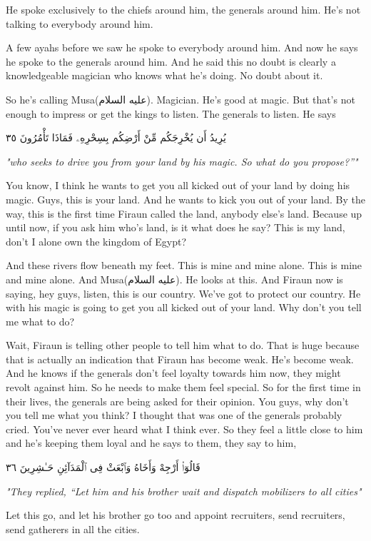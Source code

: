 \documentclass[12pt]{article}
\newcommand{\as}{\textarabic{(عليه السلام)}}
\begin{document}
He spoke exclusively to the chiefs around him, the generals around him. He's not talking to everybody around him. 

A few ayahs before we saw he spoke to everybody around him. And now he says he spoke to the generals around him. And he said this no doubt is clearly a knowledgeable magician who knows what he's doing. No doubt about it. 

So he's calling Musa\as{}. Magician. He's good at magic. But that's not enough to impress or get the kings to listen. The generals to listen. He says 

\textarabic{يُرِيدُ أَن يُخْرِجَكُم مِّنْ أَرْضِكُم بِسِحْرِهِۦ فَمَاذَا تَأْمُرُونَ ٣٥}

\textit{"who seeks to drive you from your land by his magic. So what do you propose?”"}

You know, I think he wants to get you all kicked out of your land by doing his magic. Guys, this is your land. And he wants to kick you out of your land. By the way, this is the first time Firaun called the land, anybody else's land. Because up until now, if you ask him who's land, is it what does he say? This is my land, don't I alone own the kingdom of Egypt? 

And these rivers flow beneath my feet. This is mine and mine alone. This is mine and mine alone. And Musa\as{}. He looks at this. And Firaun now is saying, hey guys, listen, this is our country. We've got to protect our country. He with his magic is going to get you all kicked out of your land. Why don't you tell me what to do? 

Wait, Firaun is telling other people to tell him what to do. That is huge because that is actually an indication that Firaun has become weak. He's become weak. And he knows if the generals don't feel loyalty towards him now, they might revolt against him. So he needs to make them feel special. So for the first time in their lives, the generals are being asked for their opinion. You guys, why don't you tell me what you think? I thought that was one of the generals probably cried. You've never ever heard what I think ever. So they feel a little close to him and he's keeping them loyal and he says to them, they say to him, 

\textarabic{قَالُوٓا۟ أَرْجِهْ وَأَخَاهُ وَٱبْعَثْ فِى ٱلْمَدَآئِنِ حَـٰشِرِينَ ٣٦}

\textit{"They replied, “Let him and his brother wait and dispatch mobilizers to all cities"}

Let this go, and let his brother go too and appoint recruiters, send recruiters, send gatherers in all the cities. 
\end{document}
